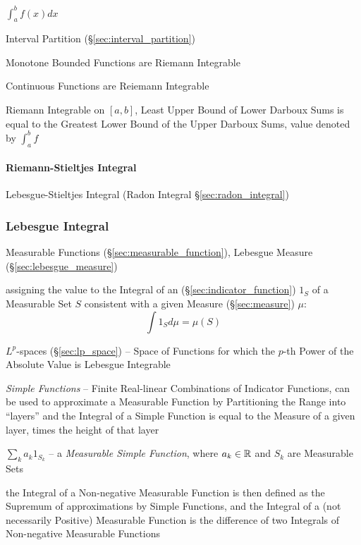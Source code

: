$\int_a^b f(x) dx$

Interval Partition (\S\ref{sec:interval_partition})

Monotone Bounded Functions are Riemann Integrable

Continuous Functions are Reiemann Integrable

Riemann Integrable on $[a,b]$, Least Upper Bound of Lower Darboux Sums
is equal to the Greatest Lower Bound of the Upper Darboux Sums, value
denoted by $\int_a^b f$



\paragraph{Riemann-Stieltjes Integral}\label{sec:riemann_stieltjes}\hfill

\fist Lebesgue-Stieltjes Integral (Radon Integral \S\ref{sec:radon_integral})



\subsubsection{Lebesgue Integral}\label{sec:lebesgue_integral}

Measurable Functions (\S\ref{sec:measurable_function}),
Lebesgue Measure (\S\ref{sec:lebesgue_measure})

assigning the value to the Integral of an (\S\ref{sec:indicator_function}) $1_S$
of a Measurable Set $S$ consistent with a given Measure (\S\ref{sec:measure})
$\mu$:
\[
  \int 1_S d\mu = \mu(S)
\]

\fist $L^p$-spaces (\S\ref{sec:lp_space}) -- Space of Functions for which the
$p$-th Power of the Absolute Value is Lebesgue Integrable

\emph{Simple Functions} -- Finite Real-linear Combinations of Indicator
Functions, can be used to approximate a Measurable Function by Partitioning the
Range into ``layers'' and the Integral of a Simple Function is equal to the
Measure of a given layer, times the height of that layer

$\sum_k a_k 1_{S_k}$ -- a \emph{Measurable Simple Function}, where
$a_k \in \mathbb{R}$ and $S_k$ are Measurable Sets

the Integral of a Non-negative Measurable Function is then defined as the
Supremum of approximations by Simple Functions, and the Integral of a (not
necessarily Positive) Measurable Function is the difference of two Integrals of
Non-negative Measurable Functions

